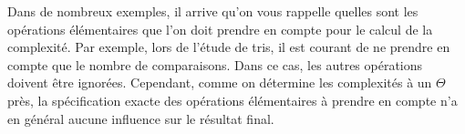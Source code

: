 \documentclass{magnolia}
\begin{document}
\vspace{2ex}
Dans de nombreux exemples, il arrive qu'on vous rappelle quelles sont les
opérations élémentaires que l'on doit prendre en compte pour le calcul de la complexité.
Par exemple, lors de l'étude de tris, il est courant de ne prendre en compte que le
nombre de comparaisons. Dans ce cas, les autres opérations doivent être ignorées.
Cependant, comme on détermine les complexités à un $\Theta$ près, la spécification exacte
des opérations élémentaires à prendre en compte n'a en général aucune influence sur le résultat final.


\end{document}
